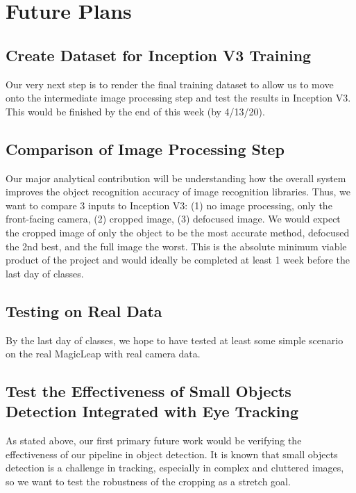 \section{Future Plans}


\subsection{Create Dataset for Inception V3 Training}

Our very next step is to render the final training dataset to allow us to move
onto the intermediate image processing step and test the results in Inception
V3. This would be finished by the end of this week (by 4/13/20).

\subsection{Comparison of Image Processing Step}

Our major analytical contribution will be understanding how the overall system
improves the object recognition accuracy of image recognition libraries. Thus,
we want to compare 3 inputs to Inception V3: (1) no image processing, only the
front-facing camera, (2) cropped image, (3) defocused image. We would expect the
cropped image of only the object to be the most accurate method, defocused the
2nd best, and the full image the worst. This is the absolute minimum viable
product of the project and would ideally be completed at least 1 week before the
last day of classes.

\subsection{Testing on Real Data}

By the last day of classes, we hope to have tested at least some simple scenario
on the real MagicLeap with real camera data.

\subsection{Test the Effectiveness of Small Objects Detection Integrated with Eye Tracking}

As stated above, our first primary future work would be verifying the
effectiveness of our pipeline in object detection. It is known that small
objects detection is a challenge in tracking, especially in complex and
cluttered images, so we want to test the robustness of the cropping as a stretch
goal.
